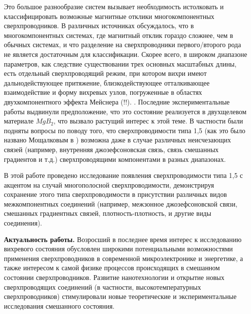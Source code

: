 Это большое разнообразие систем вызывает необходимость истолковать и 
классифицировать возможные магнитные отклики многокомпонентных 
сверхпроводников. В различных источниках обсуждалось, что в многокомпонентных 
системах, где магнитный отклик гораздо сложнее, чем в обычных системах, и что 
разделение на сверхпроводники первого/второго рода не является достаточным для 
классификации. Скорее всего, в широком диапазоне параметров, как следствие 
существовании трех основных масштабных длины, есть отдельный сверхпроводящий 
режим, при котором вихри имеют дальнодействующее притяжение, близкодействующее 
отталкивающее взаимодействие и форму вихревых узлов, погруженные в областях 
двухкомпонентного эффекта Мейснера (!!). \cite{bib:1,bib:2}. Последние 
экспериментальные работы \cite{bib:16,bib:17} выдвинули предположение, что 
это состояние реализуется в двухщелевом материале \( MgB_2 \), что вызвало 
растущий интерес к этой теме. В частности были подняты вопросы по поводу того, 
что сверхпроводимости типа 1,5 (как это было названо Мощалковым в 
\cite{bib:16}) возможна даже в случае различных неисчезающих связей (например, 
внутренняя джозефсоновская связь, связь смешанных градиентов и т.д.) 
сверхпроводящими компонентами в разных диапазонах.\cite{bib:main}

В этой работе проведено исследование появления сверхпроводимости типа 1,5 с 
акцентом на случай многополосной сверхпроводимости, демонстрируя сохранение 
этого типа сверхпроводимости в присутствии различных видов межкомпонентных 
соединений (например, межзонное джозефсоновской связи, смешанных градиентных 
связей, плотность-плотность, и другие виды соединения).

\textbf{Актуальность работы.} Возросший в последнее время интерес к 
исследованию вихревого состояния обусловлен широкими потенциальными 
возможностями применения сверхпроводников в современной микроэлектронике и 
энергетике, а также интересом к самой физике процессов происходящих в 
смешанном состоянии сверхпроводников. Развитие нанотехнологии и открытие 
новых сверхпроводящих соединений (в частности, высокотемпературных 
сверхпроводников) стимулировали новые теоретические и экспериментальные 
исследования смешанного состояния. 

